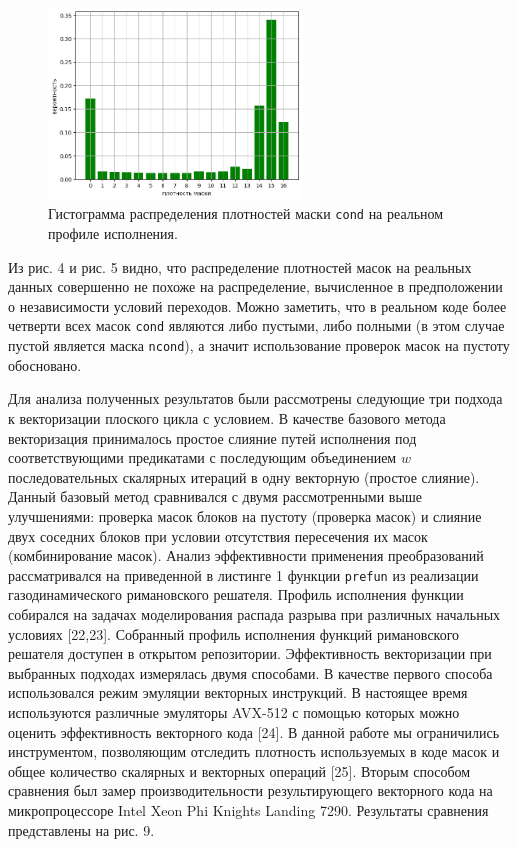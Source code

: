 \begin{figure}[ht]
	\centering
		\includegraphics[width=0.6\textwidth]{./pics/text_4_vec_comb_mask/real_p.png}
	\caption{Гистограмма распределения плотностей маски \texttt{cond} на реальном профиле исполнения.}
	\label{fig:text_4_vec_comb_mask_real_p}
\end{figure}

Из рис. 4 и рис. 5 видно, что распределение плотностей масок на реальных данных совершенно не похоже на распределение, вычисленное в предположении о независимости условий переходов.
Можно заметить, что в реальном коде более четверти всех масок \texttt{cond} являются либо пустыми, либо полными (в этом случае пустой является маска \texttt{ncond}), а значит использование проверок масок на пустоту обосновано.

Для анализа полученных результатов были рассмотрены следующие три подхода к векторизации плоского цикла с условием.
В качестве базового метода векторизация принималось простое слияние путей исполнения под соответствующими предикатами с последующим объединением $w$ последовательных скалярных итераций в одну векторную (простое слияние).
Данный базовый метод сравнивался с двумя рассмотренными выше улучшениями: проверка масок блоков на пустоту (проверка масок) и слияние двух соседних блоков при условии отсутствия пересечения их масок (комбинирование масок).
Анализ эффективности применения преобразований рассматривался на приведенной в листинге 1 функции \texttt{prefun} из реализации газодинамического римановского решателя.
Профиль исполнения функции собирался на задачах моделирования распада разрыва при различных начальных условиях [22,23].
Собранный профиль исполнения функций римановского решателя доступен в открытом репозитории.
Эффективность векторизации при выбранных подходах измерялась двумя способами. В качестве первого способа использовался режим эмуляции векторных инструкций.
В настоящее время используются различные эмуляторы AVX-512 с помощью которых можно оценить эффективность векторного кода [24].
В данной работе мы ограничились инструментом, позволяющим отследить плотность используемых в коде масок и общее количество скалярных и векторных операций [25].
Вторым способом сравнения был замер производительности результирующего векторного кода на микропроцессоре Intel Xeon Phi Knights Landing 7290.
Результаты сравнения представлены на рис. 9.

